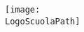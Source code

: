 \documentclass[italian, a4paper]{article}
\begin{document}
\Titolo

\begin{figure}[!ht]\centering
\texttt{[image: \\LogoScuolaPath]}
\end{figure}
\MarginSize
\end{document}
